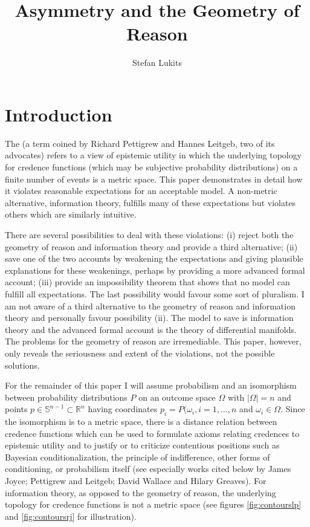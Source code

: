 \documentclass[11pt]{article}
\begin{document}
\setpagewiselinenumbers \modulolinenumbers[5] \linenumbers


\title{Asymmetry and the Geometry of Reason} \author{Stefan Lukits}
\date{}
\maketitle

\section{Introduction}
\label{intr}

The  (a term coined by Richard Pettigrew and
Hannes Leitgeb, two of its advocates) refers to a view of epistemic
utility in which the underlying topology for credence functions (which
may be subjective probability distributions) on a finite number of
events is a metric space. This paper demonstrates in detail how it
violates reasonable expectations for an acceptable model. A non-metric
alternative, information theory, fulfills many of these expectations
but violates others which are similarly intuitive. 

There are several possibilities to deal with these violations: (i)
reject both the geometry of reason and information theory and provide
a third alternative; (ii) save one of the two accounts by weakening
the expectations and giving plausible explanations for these
weakenings, perhaps by providing a more advanced formal account; (iii)
provide an impossibility theorem that shows that no model can fulfill
all expectations. The last possibility would favour some sort of
pluralism. I am not aware of a third alternative to the geometry of
reason and information theory and personally favour possibility (ii).
The model to save is information theory and the advanced formal
account is the theory of differential manifolds. The problems for the
geometry of reason are irremediable. This paper, however, only reveals
the seriousness and extent of the violations, not the possible
solutions.

For the remainder of this paper I will assume probabilism and an
isomorphism between probability distributions $P$ on an outcome space
$\Omega$ with $|\Omega|=n$ and points
$p\in\mathbb{S}^{n-1}\subset\mathbb{R}^{n}$ having coordinates
$p_{i}=P(\omega_{i},i=1,\ldots,n$ and $\omega_{i}\in{}\Omega$. Since
the isomorphism is to a metric space, there is a distance relation
between credence functions which can be used to formulate axioms
relating credences to epistemic utility and to justify or to criticize
contentious positions such as Bayesian conditionalization, the
principle of indifference, other forms of conditioning, or probabilism
itself (see especially works cited below by James Joyce; Pettigrew and
Leitgeb; David Wallace and Hilary Greaves). For information theory, as
opposed to the geometry of reason, the underlying topology for
credence functions is not a metric space (see figures
\ref{fig:contourslp} and \ref{fig:contoursrj} for illustration).
\end{document}
